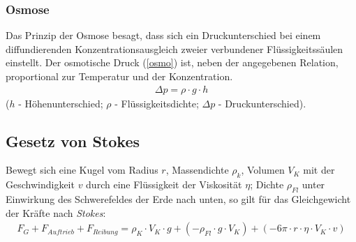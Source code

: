 \documentclass[numbers=noenddot,12pt,a4paper]{scrartcl}
\newcommand{\tilt}[1]{\textit{#1}}
\begin{document}
\subsubsection{Osmose} \label{osmosesec}
 Das Prinzip der Osmose besagt, dass sich ein Druckunterschied bei einem diffundierenden Konzentrationsausgleich zweier verbundener Flüssigkeitssäulen einstellt. Der osmotische Druck (\ref{osmo}) ist, neben der angegebenen Relation, proportional zur Temperatur und der Konzentration.
\begin{align}
\Delta p= \rho\cdot g\cdot h \label{osmo}
\end{align}
($h$ - Höhenunterschied; $\rho$ - Flüssigkeitsdichte; $\Delta p$ - Druckunterschied).
\subsection{Gesetz von Stokes}
Bewegt sich eine Kugel vom Radius $r$, Massendichte $\rho_k$, Volumen $V_K$ mit der Geschwindigkeit $v$ durch eine Flüssigkeit der Viskosität $\eta$; Dichte $\rho_{Fl}$ unter Einwirkung des Schwerefeldes der Erde nach unten, so gilt für das Gleichgewicht der Kräfte nach \tilt{Stokes}:
\begin{align}
F_{G}+F_{Auftrieb}+F_{Reibung}=\rho_K \cdot V_K \cdot g + \left(-\rho_{Fl} \cdot g \cdot V_K\right)+ \left(-6\pi\cdot r\cdot\eta\cdot V_K\cdot v\right) \label{stokes}
\end{align}
\end{document}
